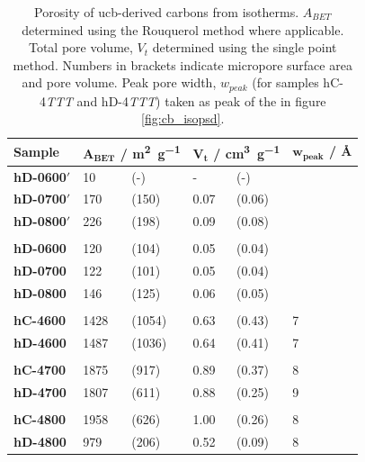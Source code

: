 \begin{table}[hb!]
    \centering
    \caption{Porosity of \acrshort{ucb}-derived carbons from  isotherms. $A_{BET}$ determined using the Rouquerol method where applicable. Total pore volume, $V_t$ determined using the single point method. Numbers in brackets indicate micropore surface area and pore volume. Peak pore width, $w_{peak}$ (for samples hC-4\textit{TTT} and hD-4\textit{TTT}) taken as peak of the  in figure \ref{fig:cb_isopsd}.}
    \label{tb:cb_porosity}
    \begin{tabularx}{0.9\textwidth}{lllllll}
    \toprule
        \textbf{Sample} & \multicolumn{2}{l}{$\mathbf{A_{BET}}$ \textbf{/ \unit[detect-weight]{\metre\squared\per\gram}}}  & \multicolumn{2}{l}{$\mathbf{V_t}$ \textbf{/ \unit[detect-weight]{\cm\cubed\per\gram}}} & \multicolumn{2}{l}{$\mathbf{w_{peak}}$ \textbf{/ \unit{\angstrom}}} \\
    \midrule
        \textbf{hD-0600$'$} & 10 & (-) & - & (-) & \\
        \textbf{hD-0700$'$} & 170 & (150) & 0.07 & (0.06) \\
        \textbf{hD-0800$'$} & 226 & (198) & 0.09 & (0.08) \\
        & & & \\
        \textbf{hD-0600} & 120 & (104) & 0.05 & (0.04) & \\
        \textbf{hD-0700} & 122 &  (101) & 0.05 & (0.04) & \\
        \textbf{hD-0800} & 146 & (125) & 0.06 & (0.05) \\
        & & & \\
        \textbf{hC-4600} & 1428 & (1054) & 0.63 & (0.43) & 7  \\
        \textbf{hD-4600} & 1487 & (1036) & 0.64 & (0.41) & 7 \\
        & & & \\
        \textbf{hC-4700} & 1875 & (917) & 0.89 & (0.37) & 8 \\
        \textbf{hD-4700} & 1807 & (611) & 0.88 & (0.25) & 9  \\
        & & & \\
        \textbf{hC-4800} & 1958 & (626) & 1.00 & (0.26) & 8 \\
        \textbf{hD-4800} & 979 & (206) & 0.52 & (0.09) &  8 \\
    \bottomrule
    \end{tabularx}
\end{table}

